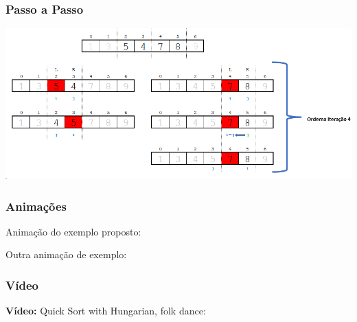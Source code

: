 \documentclass[
	11pt, %
]{beamer}
\begin{document}
\begin{frame}
	\frametitle{Passo a Passo}
	\includegraphics[width=0.9\linewidth]{o4}
\end{frame}
\begin{frame}
	\frametitle{Animações}
	\justifying
	
	Animação do exemplo proposto:
	
	\begin{center}
	\end{center}

	Outra animação de exemplo:
	\begin{center}
	\end{center}

\end{frame}

\begin{frame}
	\frametitle{Vídeo}
	\justifying
	
	\textbf{Vídeo:} Quick Sort with Hungarian, folk dance:
	
\begin{figure}
	
	
\end{figure}
	
\end{frame}
\end{document}
